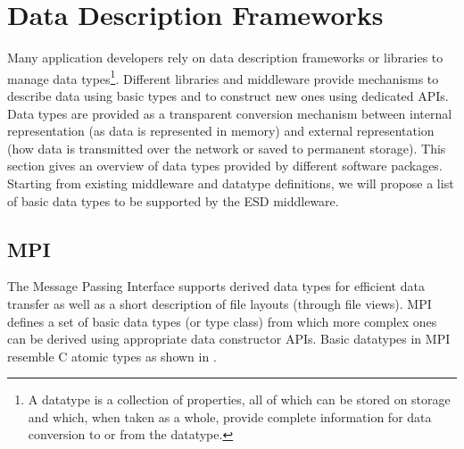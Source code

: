 \section{Data Description Frameworks}
\label{sec: data-formats}


Many application developers rely on data description frameworks or libraries to manage data types\footnote{A datatype is a collection of properties, all of which can be stored on storage and which, when taken as a whole, provide complete information for data conversion to or from the datatype.}.
Different libraries and middleware provide mechanisms to describe data using basic types and to construct new ones using dedicated APIs.
Data types are provided as a transparent conversion mechanism between internal representation (as data is represented in memory) and external representation (how data is transmitted over the network or saved to permanent storage).
This section gives an overview of data types provided by different software packages.
Starting from existing middleware and datatype definitions, we will propose a list of basic data types to be supported by the ESD middleware.


\subsection{MPI}
The Message Passing Interface supports derived data types for efficient data transfer as well as a short description of file layouts (through file views). MPI defines a set of basic data types (or type class) from which more complex ones can be derived using appropriate data constructor APIs. Basic datatypes in MPI resemble C atomic types as shown in .

\clearpage

